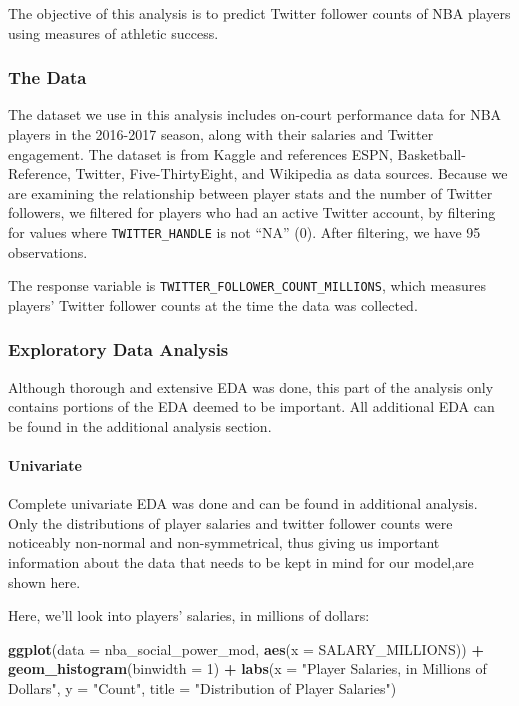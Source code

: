 \documentclass[]{article}
\newenvironment{Shaded}{\begin{snugshade}}{\end{snugshade}}
\newcommand{\DataTypeTok}[1]{\textcolor[rgb]{0.13,0.29,0.53}{#1}}
\newcommand{\DecValTok}[1]{\textcolor[rgb]{0.00,0.00,0.81}{#1}}
\newcommand{\KeywordTok}[1]{\textcolor[rgb]{0.13,0.29,0.53}{\textbf{#1}}}
\newcommand{\NormalTok}[1]{#1}
\newcommand{\OperatorTok}[1]{\textcolor[rgb]{0.81,0.36,0.00}{\textbf{#1}}}
\newcommand{\StringTok}[1]{\textcolor[rgb]{0.31,0.60,0.02}{#1}}
\let\oldparagraph\paragraph
\renewcommand{\paragraph}[1]{\oldparagraph{#1}\mbox{}}
\begin{document}
The objective of this analysis is to predict Twitter follower counts of
NBA players using measures of athletic success.

\hypertarget{the-data}{%
\subsubsection{The Data}\label{the-data}}

The dataset we use in this analysis includes on-court performance data
for NBA players in the 2016-2017 season, along with their salaries and
Twitter engagement. The dataset is from Kaggle and references ESPN,
Basketball-Reference, Twitter, Five-ThirtyEight, and Wikipedia as data
sources. Because we are examining the relationship between player stats
and the number of Twitter followers, we filtered for players who had an
active Twitter account, by filtering for values where
\texttt{TWITTER\_HANDLE} is not ``NA'' (0). After filtering, we have 95
observations.

The response variable is \texttt{TWITTER\_FOLLOWER\_COUNT\_MILLIONS},
which measures players' Twitter follower counts at the time the data was
collected.

\hypertarget{exploratory-data-analysis}{%
\subsubsection{Exploratory Data
Analysis}\label{exploratory-data-analysis}}

Although thorough and extensive EDA was done, this part of the analysis
only contains portions of the EDA deemed to be important. All additional
EDA can be found in the additional analysis section.

\hypertarget{univariate}{%
\paragraph{Univariate}\label{univariate}}

Complete univariate EDA was done and can be found in additional
analysis. Only the distributions of player salaries and twitter follower
counts were noticeably non-normal and non-symmetrical, thus giving us
important information about the data that needs to be kept in mind for
our model,are shown here.

Here, we'll look into players' salaries, in millions of dollars:

\begin{Shaded}
\begin{Highlighting}[]
\KeywordTok{ggplot}\NormalTok{(}\DataTypeTok{data =}\NormalTok{ nba_social_power_mod,}
       \KeywordTok{aes}\NormalTok{(}\DataTypeTok{x =}\NormalTok{ SALARY_MILLIONS)) }\OperatorTok{+}\StringTok{ }
\StringTok{  }\KeywordTok{geom_histogram}\NormalTok{(}\DataTypeTok{binwidth =} \DecValTok{1}\NormalTok{) }\OperatorTok{+}
\StringTok{  }\KeywordTok{labs}\NormalTok{(}\DataTypeTok{x =} \StringTok{"Player Salaries, in Millions of Dollars"}\NormalTok{,}
       \DataTypeTok{y =} \StringTok{"Count"}\NormalTok{,}
       \DataTypeTok{title =} \StringTok{"Distribution of Player Salaries"}\NormalTok{)}
\end{Highlighting}
\end{Shaded}
\end{document}
